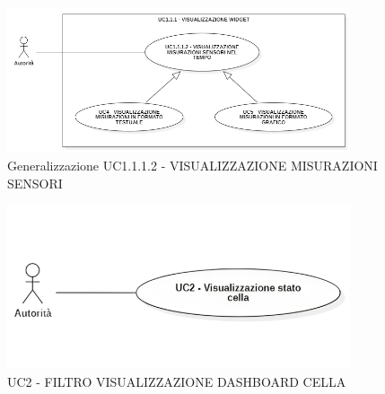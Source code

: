 





\begin{figure}[H]
    \centering
    \includegraphics[width=0.9\textwidth]{../Images/uc1.1.1.2Gen.PNG}
    \caption{Generalizzazione UC1.1.1.2 - VISUALIZZAZIONE MISURAZIONI SENSORI}
    \label{fig:UC3_gen}
\end{figure}

\newpage









\begin{figure}[H]
    \centering
    \includegraphics[width=0.9\textwidth]{../Images/uc2.png}
    \caption{UC2 - FILTRO VISUALIZZAZIONE DASHBOARD CELLA}
    \label{fig:UC2}
\end{figure}

